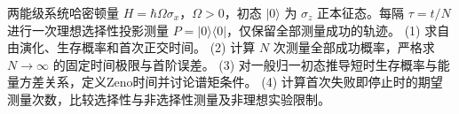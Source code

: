 两能级系统哈密顿量 \(H=\hbar\Omega\sigma_x\)，\(\Omega>0\)，初态 \(|0\rangle\) 为 \(\sigma_z\) 正本征态。每隔 \(\tau=t/N\) 进行一次理想选择性投影测量 \(P=|0\rangle\langle0|\)，仅保留全部测量成功的轨迹。
(1) 求自由演化、生存概率和首次正交时间。
(2) 计算 \(N\) 次测量全部成功概率，严格求 \(N\to\infty\) 的固定时间极限与首阶误差。
(3) 对一般归一初态推导短时生存概率与能量方差关系，定义Zeno时间并讨论谱矩条件。
(4) 计算首次失败即停止时的期望测量次数，比较选择性与非选择性测量及非理想实验限制。
